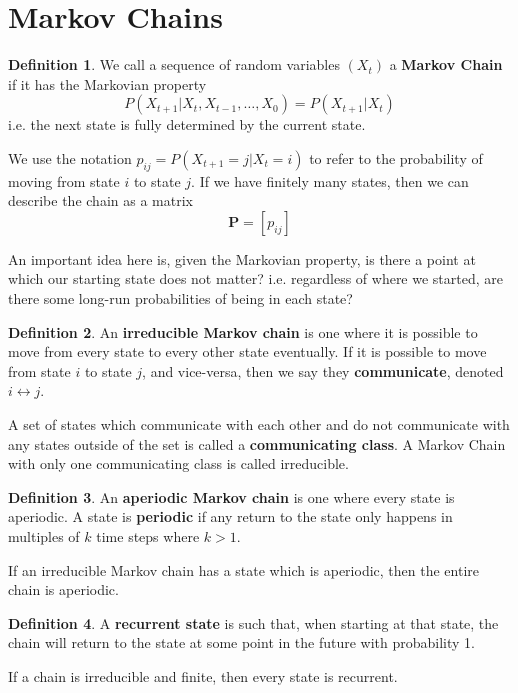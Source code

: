 \documentclass[12pt]{article}
\theoremstyle{definition}
\newtheorem{definition}{Definition}[section]
\theoremstyle{remark}
\begin{document}
\section{Markov Chains}

\begin{definition}
We call a sequence of random variables $(X_t)$ a \textbf{Markov Chain} if it has the Markovian property \[ P(X_{t+1} | X_t, X_{t-1},\dots,X_0) = P(X_{t+1} | X_t) \] i.e. the next state is fully determined by the current state.

We use the notation $p_{ij} = P(X_{t+1}  = j| X_t = i)$ to refer to the probability of moving from state $i$ to state $j$. If we have finitely many states, then we can describe the chain as a matrix \[ \mathbf{P} = [p_{ij}] \]
\end{definition}

An important idea here is, given the Markovian property, is there a point at which our starting state does not matter? i.e. regardless of where we started, are there some long-run probabilities of being in each state?

\begin{definition}
An \textbf{irreducible Markov chain} is one where it is possible to move from every state to every other state eventually. If it is possible to move from state $i$ to state $j$, and vice-versa, then we say they \textbf{communicate}, denoted $i \leftrightarrow j$.

A set of states which communicate with each other and do not communicate with any states outside of the set is called a \textbf{communicating class}. A Markov Chain with only one communicating class is called irreducible.
\end{definition}

\begin{definition}
An \textbf{aperiodic Markov chain} is one where every state is aperiodic. A state is \textbf{periodic} if any return to the state only happens in multiples of $k$ time steps where $k > 1$.

If an irreducible Markov chain has a state which is aperiodic, then the entire chain is aperiodic.
\end{definition}

\begin{definition}
A \textbf{recurrent state} is such that, when starting at that state, the chain will return to the state at some point in the future with probability 1.

If a chain is irreducible and finite, then every state is recurrent.
\end{definition}
\end{document}

